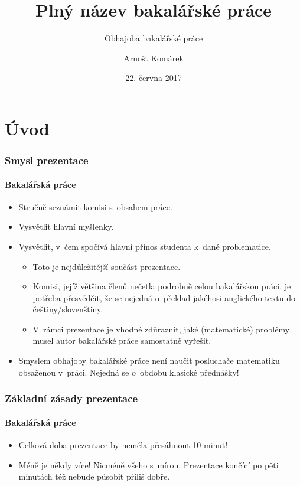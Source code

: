 \documentclass[c, 10pt]{beamer}
\title[Kratší název]{%
       Plný název bakalářské práce}
\subtitle[]{Obhajoba bakalářské práce}
\author[http://msekce.karlin.mff.cuni.cz/\~{}komarek]{%
        Arnošt Komárek}
\institute[KPMS]{%
           Katedra pravděpodobnosti a~matematické statistiky}
\date[22.6.2017]{%
      22. června 2017}
\begin{document}
\frame[plain]{\titlepage}


\section{Úvod}

\begin{frame}\frametitle{Smysl prezentace}
\framesubtitle{Bakalářská práce}

\begin{itemize}\itemsep=1em
\item Stručně seznámit komisi s~obsahem práce.
\item Vysvětlit \alert{hlavní} myšlenky.
\item Vysvětlit, v~čem spočívá \alert{hlavní přínos studenta} k~dané problematice.
  \begin{itemize}\color{colTwo}\itemsep=1ex
  \item Toto je nejdůležitější součást prezentace.
  \item Komisi, jejíž většina členů nečetla podrobně celou bakalářskou práci,
    je potřeba přesvědčit, že se nejedná o~překlad jakéhosi anglického textu 
    do češtiny/slovenštiny.
  \item V~rámci prezentace je vhodné zdůraznit, jaké (matematické) problémy musel
    autor bakalářské práce samostatně vyřešit.
  \end{itemize}
\item Smyslem obhajoby bakalářské práce \alert{není} naučit posluchače 
  matematiku obsaženou v~práci. Nejedná se o~obdobu klasické přednášky!
\end{itemize}
\end{frame}

\begin{frame}\frametitle{Základní zásady prezentace}
\framesubtitle{Bakalářská práce}

\begin{itemize}\itemsep=1em
\item Celková doba prezentace by neměla přesáhnout \alert{10 minut!}
\item Méně je někdy více! Nicméně všeho s~mírou. Prezentace končící po pěti minutách též nebude působit příliš dobře.
\end{itemize}
\end{frame}
\end{document}
